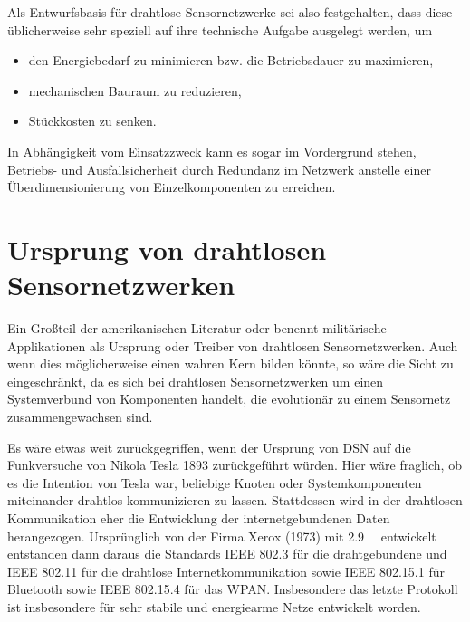 Als Entwurfsbasis für drahtlose Sensornetzwerke sei also festgehalten, dass diese üblicherweise sehr speziell auf ihre technische Aufgabe ausgelegt werden, um
\begin{itemize}
	\item den Energiebedarf zu minimieren bzw. die Betriebsdauer zu maximieren,
	\item mechanischen Bauraum zu reduzieren,
	\item Stückkosten zu senken.
\end{itemize}
In Abhängigkeit vom Einsatzzweck kann es sogar im Vordergrund stehen, Betriebs- und Ausfallsicherheit durch Redundanz im Netzwerk anstelle einer Überdimensionierung von Einzelkomponenten zu erreichen.

\section{Ursprung von drahtlosen Sensornetzwerken}
Ein Großteil der amerikanischen Literatur \parencite[S.~8]{Dargie2010} oder \parencite[S.~2]{Obaidat2014} benennt militärische Applikationen als Ursprung oder Treiber von drahtlosen Sensornetzwerken. Auch wenn dies möglicherweise einen wahren Kern bilden könnte, so wäre die Sicht zu eingeschränkt, da es sich bei drahtlosen Sensornetzwerken um einen Systemverbund von Komponenten handelt, die evolutionär zu einem Sensornetz zusammengewachsen sind.

Es wäre etwas weit zurückgegriffen, wenn der Ursprung von \ac{DSN} auf die Funkversuche von Nikola Tesla 1893 zurückgeführt würden. Hier wäre fraglich, ob es die Intention von Tesla war, beliebige Knoten oder Systemkomponenten miteinander drahtlos kommunizieren zu lassen. Stattdessen wird in der drahtlosen Kommunikation eher die Entwicklung der internetgebundenen Daten herangezogen. Ursprünglich von der Firma Xerox (1973) mit \SI{2.9}{\mega\bit} entwickelt entstanden dann daraus die Standards IEEE 802.3 für die drahtgebundene und IEEE 802.11 für die drahtlose Internetkommunikation sowie IEEE 802.15.1 für Bluetooth sowie IEEE 802.15.4 für das \ac{WPAN}. Insbesondere das letzte Protokoll ist insbesondere für sehr stabile und energiearme Netze entwickelt worden.

